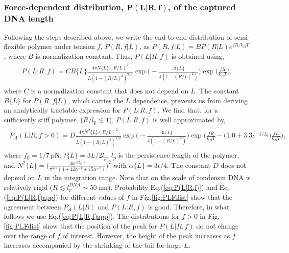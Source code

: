 \documentclass[fleqn,10pt]{wlscirep}
\newcommand{\pN}{\ \mathrm{pN}}
\newcommand{\nm}{\ \mathrm{nm}}
\newcommand{\vR}{R}
\newcommand{\vL}{L}
\begin{document}
\subsubsection*{Force-dependent distribution, $\boldsymbol{P(\vL|\vR,f)}$, of the captured DNA length}
Following the steps described above, we write the 
end-to-end distribution of semi-flexible polymer under tension $f$, $P(\vR,f|\vL)$, as $P(\vR,f|\vL) = B P(\vR|\vL)e^{f R/k_BT}$, where $B$ is normalization constant. Thus, $P(\vL|\vR,f)$ is obtained using,
\begin{align} 
\begin{split}
\label{eq:P(L|R,f)}
P(\vL|\vR,f) = C B\{\vL \} \frac{4\pi N\{\vL \} (\vR/\vL)^2}{\vL(1-(\vR/\vL)^2)^{9/2}} \exp\Big(-\frac{3t\{\vL\}}{4(1-(\vR/\vL)^2)}\Big) \exp\Big(\frac{f\vR}{k_BT}  \Big)  ,
\end{split} 
\end{align}
where $C$ is a normalization constant that does not depend on $\vL$. The constant $B\{\vL \}$ for $P(\vR,f|\vL)$, which carries the $\vL$ dependence, prevents us from deriving an analytically tractable expression for $P(\vL|\vR,f)$. We find that, for a sufficiently stiff polymer, ($\vR/l_p \lesssim 1$), $P(\vL|\vR,f)$ is well approximated by,
\begin{align} 
\begin{split}
\label{eq:P(L|R,f)app}
P_{A}(\vL|\vR,f >  0) = D \frac{4\pi N^2\{\vL \} (\vR/\vL)^2}{\vL(1-(\vR/\vL)^2)^{9/2}} \exp\Big(-\frac{3t\{\vL\}}{4(1-(\vR/\vL)^2)}\Big) \exp\Big(\frac{f\vR}{k_BT} -\big(1.0+3.3e^{-f/f_0}\big) \frac{f \vL}{k_BT} \Big) ,
\end{split} 
\end{align}
where $f_0=1/7\pN$, $t\{\vL\}=3\vL/2l_p$, $l_p$ is the persistence length of the polymer, and  $N^2\{\vL\}=\Big(\frac{4\alpha^{3/2}e^{\alpha}}{\pi^{3/2}(4+12\alpha^{-1}+15\alpha^{-2})}\Big)^2$ with $\alpha\{\vL\}=3t/4$. The constant $D$  does not depend on $\vL$ in the integration range. Note that on the scale of condensin DNA is relatively rigid ($R \lesssim l^{DNA}_p \sim 50\nm$). Probability Eq.(\ref{eq:P(L|R,f)}) and Eq.(\ref{eq:P(L|R,f)app}) for different values of $f$ in Fig.\ref{fig:PLFdist} show that the agreement between $P_{A}(\vL|\vR)$ and $P(\vL|\vR,f)$ is good. Therefore, in what follows we use  Eq.(\ref{eq:P(L|R,f)app}). The distributions for $f>0$ in Fig.\ref{fig:PLFdist} show that the position of the peak for $ P(\vL|\vR,f)$ do not change over the range of $f$ of interest. However, the height of the peak increases as $f$ increases accompanied by the shrinking of the tail for large $\vL$.
\end{document}

